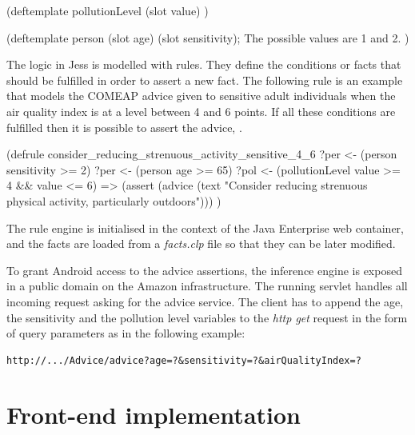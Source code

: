{\centering
\begin{spverbatim}
(deftemplate pollutionLevel
    (slot value)
)

(deftemplate person
    (slot age)
    (slot sensitivity); The possible values are 1 and 2.
)
\end{spverbatim}
\par
}

The logic in Jess is modelled with rules. They define the conditions or facts that should be fulfilled in order to assert a new fact. The following rule is an example that models the COMEAP advice given to sensitive adult individuals when the air quality index is at a level between 4 and 6 points. If all these conditions are fulfilled then it is possible to assert the advice,  \cite{HealthProtectionAgencyfortheCommitteeontheMedicalEffectsofAirPollutants2011}. 

{\centering
\begin{spverbatim}
(defrule consider_reducing_strenuous_activity_sensitive_4_6
    ?per <- (person {sensitivity >= 2})
    ?per <- (person {age >= 65})
    ?pol <- (pollutionLevel {value >= 4 && value <= 6})
    =>
    (assert
        (advice (text "Consider reducing strenuous physical activity, particularly outdoors")))
)
\end{spverbatim}
\par
}
The rule engine is initialised in the context of the Java Enterprise web container, and the facts are loaded from a \textit{facts.clp} file so that they can be later modified. 

To grant Android access to the advice assertions, the inference engine is exposed in a public domain on the Amazon infrastructure. The running servlet handles all incoming  request asking for the advice service. The client has to append the age, the sensitivity and the pollution level variables to the \textit{http get} request in the form of query parameters as in the following example: \bigskip

{\centering
\begin{BVerbatim}
http://.../Advice/advice?age=?&sensitivity=?&airQualityIndex=?
\end{BVerbatim}
\par
}

\section{Front-end implementation}
